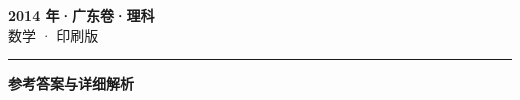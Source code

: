 \documentclass[zihao=5, a4paper]{ctexart}
\begin{document}
\begin{center}
  {\Large\bfseries 2014 年·广东卷·理科}\\[4pt]
  {\large 数学 · 印刷版}
\end{center}
\medskip
{}

\par\bigskip\hrule\bigskip
{}
\Needspace{0.55\textheight}
\begin{center}{\large\bfseries 参考答案与详细解析}\end{center}
\smallskip

\end{document}
